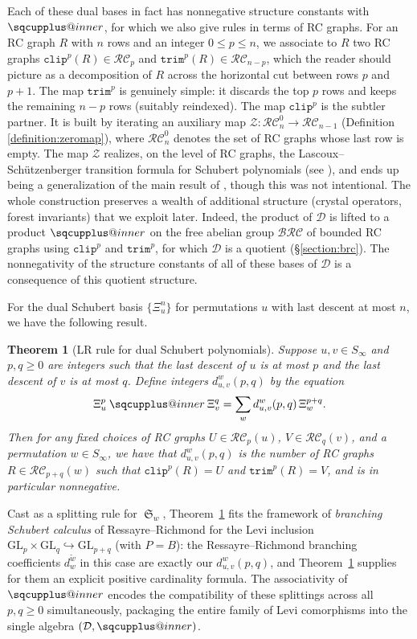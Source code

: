 \documentclass[a4paper,fleqn]{cas-sc}
\makeatletter
\newcommand{\sqcupplus@inner}[2]{%
  \vcenter{\hbox{\ooalign{%
    \hfil$\m@th#1\sqcup$\hfil\cr
    \hfil\raisebox{0.15ex}{$\m@th#1\scriptscriptstyle+$}\hfil\cr
  }}}%
}
\newcommand{\sqcupplus}{\mathbin{\mathpalette\sqcupplus@inner\relax}}
\newtheorem{theorem}{Theorem}[section]
\theoremstyle{definition}
\theoremstyle{remark}
\numberwithin{equation}{subsection}
\DeclareMathOperator{\sch}{\mathfrak{S}}
\newcommand{\trm}{\mathtt{trim}}
\newcommand{\zeromap}{\mathcal{Z}}
\newcommand{\clp}{\mathtt{clip}}
\newcommand{\BRC}{\mathcal{BRC}}
\newcommand{\RC}{\mathcal{RC}}
\newcommand{\dsch}{\ensuremath{\Xi}}
\newcommand{\dcoma}{\mathcal{D}}
\makeatother
\begin{document}
Each of these dual bases in fact has nonnegative structure constants with $\sqcupplus$, for which we also give rules in terms of RC graphs. For an RC graph $R$ with $n$ rows and an integer $0\leq p\leq n$, we associate to $R$ two RC graphs $\clp^p(R)\in\RC_p$ and $\trm^p(R)\in\RC_{n-p}$, which the reader should picture as a decomposition of $R$ across the horizontal cut between rows $p$ and $p+1$. The map $\trm^p$ is genuinely simple: it discards the top $p$ rows and keeps the remaining $n-p$ rows (suitably reindexed). The map $\clp^p$ is the subtler partner. It is built by iterating an auxiliary map $\zeromap:\RC_n^0\to\RC_{n-1}$ (Definition \ref{definition:zeromap}), where $\RC_n^0$ denotes the set of RC graphs whose last row is empty. The map $\zeromap$ realizes, on the level of RC graphs, the Lascoux--Schützenberger transition formula for Schubert polynomials (see \cite{notes}), and ends up being a generalization of the main result of \cite{little2003combinatorial}, though this was not intentional. The whole construction preserves a wealth of additional structure (crystal operators, forest invariants) that we exploit later. Indeed, the product of $\dcoma$ is lifted to a product $\sqcupplus$ on the free abelian group $\BRC$ of bounded RC graphs using $\clp^p$ and $\trm^p$, for which $\dcoma$ is a quotient (\S\ref{section:brc}). The nonnegativity of the structure constants of all of these bases of $\dcoma$ is a consequence of this quotient structure.

For the dual Schubert basis $\{\dsch_u^n\}$ for permutations $u$ with last descent at most $n$, we have the following result.

\begin{theorem}[LR rule for dual Schubert polynomials]\label{theorem:LR}
Suppose $u,v\in S_\infty$ and $p,q\geq 0$ are integers such that the last descent of $u$ is at most $p$ and the last descent of $v$ is at most $q$. Define integers $d_{u,v}^w(p, q)$ by the equation
$$\dsch_u^p \sqcupplus \dsch_v^q = \sum_{w} d_{u,v}^w(p, q)\,\dsch_w^{p+q}.$$
Then for any fixed choices of RC graphs $U\in \RC_p(u)$, $V\in\RC_q(v)$, and a permutation $w\in S_\infty$, we have that $d_{u, v}^w(p, q)$ is the number of RC graphs $R\in \RC_{p+q}(w)$ such that $\clp^p(R)=U$ and $\trm^p(R)=V$, and is in particular nonnegative.
\end{theorem}
Cast as a splitting rule for $\sch_w$, Theorem~\ref{theorem:LR} fits the framework of \emph{branching Schubert calculus} of Ressayre--Richmond \cite{ressayre2009branching} for the Levi inclusion $\mathrm{GL}_p\times \mathrm{GL}_q\hookrightarrow \mathrm{GL}_{p+q}$ (with $P=B$): the Ressayre--Richmond branching coefficients $d_w^{\tilde w}$ in this case are exactly our $d_{u,v}^w(p,q)$, and Theorem~\ref{theorem:LR} supplies for them an explicit positive cardinality formula. The associativity of $\sqcupplus$ encodes the compatibility of these splittings across all $p,q\geq 0$ simultaneously, packaging the entire family of Levi comorphisms into the single algebra $(\dcoma,\sqcupplus)$.
\end{document}
